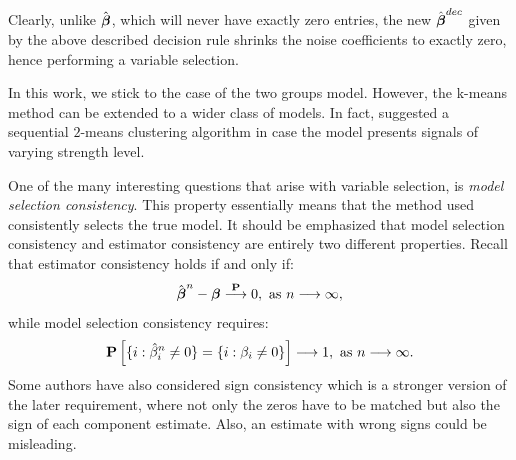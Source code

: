 \documentclass[ba]{imsart}
\begin{document}
Clearly, unlike $\hat{\boldsymbol{\beta}}$, which will never have exactly zero entries, the new $\hat{\boldsymbol{\beta}}^{dec}$ given by the above described decision rule shrinks the noise coefficients to exactly zero, hence performing a variable selection.

In this work, we stick to the case of the two groups model. However, the k-means method can be extended to a wider class of models. In fact, \citet{li2017variable} suggested a sequential $2$-means clustering algorithm in case the model presents signals of varying strength level.

One of the many interesting questions that arise with variable selection, is \textit{model selection consistency}. This property essentially means that the method used consistently selects the true model. It should be emphasized that model selection consistency and estimator consistency are entirely two different properties. Recall that estimator consistency holds if and only if:\[ \hat{\boldsymbol{\beta}}^{n} -  \boldsymbol{\beta} \stackrel{{\bf P}}{\longrightarrow}0, \ \text{as } n\longrightarrow \infty,  \]
while model selection consistency requires:
\[ \P\left[ \lbrace i : \hat{\beta}_i^{n} \neq 0 \rbrace = \lbrace i : \beta_i \neq 0\rbrace \right] \longrightarrow 1, \ \text{as } n\longrightarrow \infty. \]
Some authors have also considered sign consistency which is a stronger version of the later requirement, where not only the zeros have to be matched but also the sign of each component estimate. Also, an estimate with wrong signs could be misleading. 

\end{document}
